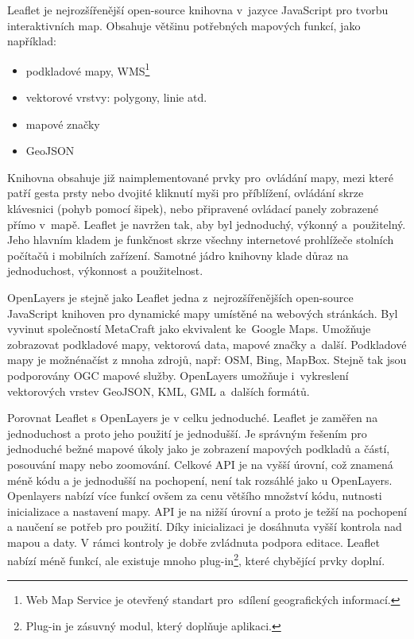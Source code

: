 \documentclass[12pt]{article}%
\begin{document}
{{%
Leaflet je nejrozšířenější open-source knihovna v~jazyce JavaScript pro tvorbu interaktivních map. 
Obsahuje většinu potřebných mapových funkcí, jako například:
\begin{itemize}
\item podkladové mapy, WMS\footnote{Web Map Service je otevřený standart pro~sdílení geografických 
informací.}
\item vektorové vrstvy: polygony, linie atd.
\item mapové značky
\item GeoJSON
\end{itemize}
Knihovna obsahuje již naimplementované prvky pro~ovládání mapy, mezi které patří gesta prsty nebo 
dvojité kliknutí myši pro příblížení, ovládání skrze klávesnici (pohyb pomocí šipek), nebo 
připravené ovládací panely zobrazené přímo v~mapě. Leaflet je navržen tak, aby byl jednoduchý, 
výkonný a~použitelný. Jeho hlavním kladem je funkčnost skrze všechny internetové prohlížeče 
stolních počítačů i mobilních zařízení. Samotné jádro knihovny klade důraz na jednoduchost, 
výkonnost a použitelnost.

OpenLayers je stejně jako Leaflet jedna z~nejrozšířenějších open-source JavaScript knihoven pro 
dynamické mapy umístěné na webových stránkách. Byl vyvinut společností MetaCraft jako ekvivalent 
ke~Google Maps. Umožňuje zobrazovat podkladové mapy, vektorová data, mapové značky a~další. 
Podkladové mapy je možnénačíst z mnoha zdrojů, např: OSM, Bing, MapBox. Stejně tak jsou 
podporovány OGC mapové služby. OpenLayers umožňuje i~vykreslení vektorových vrstev GeoJSON, KML, 
GML a~dalších formátů.

Porovnat Leaflet s OpenLayers je v celku jednoduché. Leaflet je zaměřen na jednoduchost a proto 
jeho použití je jednodušší. Je správným řešením pro jednoduché bežné mapové úkoly jako je zobrazení 
mapových podkladů a částí, posouvání mapy nebo zoomování. Celkové API je na vyšší úrovní, což 
znamená méně kódu a je jednodušší na pochopení, není tak rozsáhlé jako u OpenLayers. Openlayers 
nabízí více funkcí ovšem za cenu většího množství kódu, nutnosti inicializace a nastavení mapy. 
API je na nižší úrovní a proto je težší na pochopení a naučení se potřeb pro použití.
Díky inicializaci je dosáhnuta vyšší kontrola nad mapou a daty. V rámci kontroly je dobře zvládnuta 
podpora editace. Leaflet nabízí méně funkcí, ale existuje mnoho plug-in\footnote{Plug-in je 
zásuvný modul, který doplňuje aplikaci.}, které chybějící prvky doplní.

}}
\end{document}
